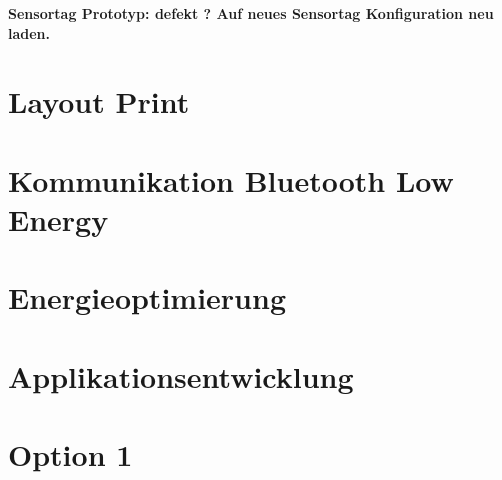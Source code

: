 \textbf{Sensortag Prototyp: defekt ? Auf neues Sensortag Konfiguration neu laden.
}


\section{Layout Print}

\section{Kommunikation Bluetooth Low Energy}

\section{Energieoptimierung}



\section{Applikationsentwicklung}

\section{Option 1}






